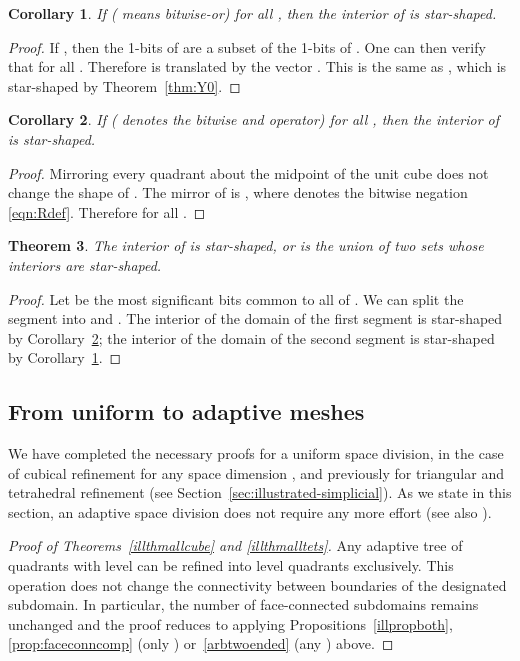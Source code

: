 \documentclass[a4paper,11pt]{article}
\newcommand{\eqnref}[1]{\eqref{eqn:#1}}
\newcommand{\seclab}[1]{\label{sec:#1}}
\newcommand{\secref}[1]{Section~\ref{sec:#1}}
\newcommand{\thmref}[1]{Theorem~\ref{thm:#1}}
\newtheorem{thm}{Theorem}
\newtheorem{cor}[thm]{Corollary}
\begin{document}
\begin{cor}
  \label{cor:start}
  If  ( means bitwise-or) for all
  , then the interior of
   is star-shaped.
\end{cor}
\begin{proof}
  If , then the 1-bits of 
  are a subset of the 1-bits of .  One can then verify that
   for all .
  Therefore  is  translated by the vector
  .  This is the
  same as ,
  which is star-shaped by \thmref{Y0}.
\end{proof}

\begin{cor}
  \label{cor:end}
  If  ( denotes the bitwise and operator) for all
  , then the interior of 
 is star-shaped.
\end{cor}
\begin{proof}
  Mirroring every quadrant about the midpoint of the unit cube does not change
  the shape of .  The mirror of  is , where 
  denotes the bitwise negation \eqnref{Rdef}.
  Therefore  for all .
\end{proof}

\begin{thm}
  \label{thm:uniontwo}
  The interior of
 is
  star-shaped, or  is the union of two sets whose interiors are
  star-shaped.
\end{thm}
\begin{proof}
  Let  be the most significant bits common to all of
  .  We can split the segment into
   and
  .  The interior of the
  domain of the first segment is star-shaped by Corollary~\ref{cor:end}; the
  interior of the domain of the second segment is star-shaped by
  Corollary~\ref{cor:start}.
\end{proof}

\subsection{From uniform to adaptive meshes}
\seclab{main}

We have completed the necessary proofs for a uniform space division, in the
case of cubical refinement for any space dimension , and previously for
triangular and tetrahedral refinement (see \secref{illustrated-simplicial}).
As we state in this section, an adaptive space division does not require any
more effort (see also \cite[page 176]{Bader12}).
\begin{proof}[Proof of Theorems~\ref{illthmallcube} and \ref{illthmalltets}]Any adaptive tree of quadrants with level  can be refined into level
   quadrants exclusively.  This operation does not change the connectivity
  between boundaries of the designated subdomain.  In particular, the number of
  face-connected subdomains remains unchanged and the proof reduces to applying
  Propositions~\ref{illpropboth}, \ref{prop:faceconncomp} (only )
  or~\ref{arbtwoended} (any ) above.
\end{proof}
\end{document}
